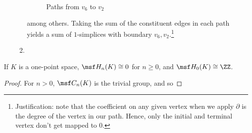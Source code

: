 \begin{solution}
\begin{enumerate}[label=(\roman*)]
\begin{enumerate}
\begin{figure}[H]
\begin{minipage}{.49\linewidth}
            \end{minipage}
            \caption{Paths from $v_6$ to $v_2$}
          \end{figure}
          among others. Taking the sum of the constituent edges in each path
          yields a sum of $1$-simplices with boundary $v_6,
          v_2$.\footnote{Justification: note that the coefficient on any given
            vertex when we apply $\partial$ is the degree of the vertex in our
            path. Hence, only the initial and terminal vertex don't get mapped
            to $0$.}
        \item
      \end{enumerate}
  \end{enumerate}
\end{solution}
\begin{problem}[16.7]
  If $K$ is a one-point space, $\msf H_n(K) \cong 0$ for $n \geq 0$, and $\msf
  H_0(K) \cong \ZZ$.
\end{problem}
\begin{proof}
  For $n > 0$, $\msf C_n(K)$ is the trivial group, and so
\end{proof}
